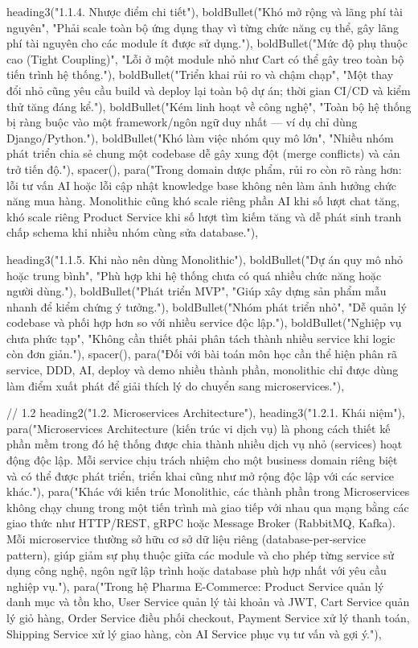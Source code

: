   heading3("1.1.4. Nhược điểm chi tiết"),
  boldBullet("Khó mở rộng và lãng phí tài nguyên", "Phải scale toàn bộ ứng dụng thay vì từng chức năng cụ thể, gây lãng phí tài nguyên cho các module ít được sử dụng."),
  boldBullet("Mức độ phụ thuộc cao (Tight Coupling)", "Lỗi ở một module nhỏ như Cart có thể gây treo toàn bộ tiến trình hệ thống."),
  boldBullet("Triển khai rủi ro và chậm chạp", "Một thay đổi nhỏ cũng yêu cầu build và deploy lại toàn bộ dự án; thời gian CI/CD và kiểm thử tăng đáng kể."),
  boldBullet("Kém linh hoạt về công nghệ", "Toàn bộ hệ thống bị ràng buộc vào một framework/ngôn ngữ duy nhất — ví dụ chỉ dùng Django/Python."),
  boldBullet("Khó làm việc nhóm quy mô lớn", "Nhiều nhóm phát triển chia sẻ chung một codebase dễ gây xung đột (merge conflicts) và cản trở tiến độ."),
  spacer(),
  para("Trong domain dược phẩm, rủi ro còn rõ ràng hơn: lỗi tư vấn AI hoặc lỗi cập nhật knowledge base không nên làm ảnh hưởng chức năng mua hàng. Monolithic cũng khó scale riêng phần AI khi số lượt chat tăng, khó scale riêng Product Service khi số lượt tìm kiếm tăng và dễ phát sinh tranh chấp schema khi nhiều nhóm cùng sửa database."),

  heading3("1.1.5. Khi nào nên dùng Monolithic"),
  boldBullet("Dự án quy mô nhỏ hoặc trung bình", "Phù hợp khi hệ thống chưa có quá nhiều chức năng hoặc người dùng."),
  boldBullet("Phát triển MVP", "Giúp xây dựng sản phẩm mẫu nhanh để kiểm chứng ý tưởng."),
  boldBullet("Nhóm phát triển nhỏ", "Dễ quản lý codebase và phối hợp hơn so với nhiều service độc lập."),
  boldBullet("Nghiệp vụ chưa phức tạp", "Không cần thiết phải phân tách thành nhiều service khi logic còn đơn giản."),
  spacer(),
  para("Đối với bài toán môn học cần thể hiện phân rã service, DDD, AI, deploy và demo nhiều thành phần, monolithic chỉ được dùng làm điểm xuất phát để giải thích lý do chuyển sang microservices."),

  // 1.2
  heading2("1.2. Microservices Architecture"),
  heading3("1.2.1. Khái niệm"),
  para("Microservices Architecture (kiến trúc vi dịch vụ) là phong cách thiết kế phần mềm trong đó hệ thống được chia thành nhiều dịch vụ nhỏ (services) hoạt động độc lập. Mỗi service chịu trách nhiệm cho một business domain riêng biệt và có thể được phát triển, triển khai cũng như mở rộng độc lập với các service khác."),
  para("Khác với kiến trúc Monolithic, các thành phần trong Microservices không chạy chung trong một tiến trình mà giao tiếp với nhau qua mạng bằng các giao thức như HTTP/REST, gRPC hoặc Message Broker (RabbitMQ, Kafka). Mỗi microservice thường sở hữu cơ sở dữ liệu riêng (database-per-service pattern), giúp giảm sự phụ thuộc giữa các module và cho phép từng service sử dụng công nghệ, ngôn ngữ lập trình hoặc database phù hợp nhất với yêu cầu nghiệp vụ."),
  para("Trong hệ Pharma E-Commerce: Product Service quản lý danh mục và tồn kho, User Service quản lý tài khoản và JWT, Cart Service quản lý giỏ hàng, Order Service điều phối checkout, Payment Service xử lý thanh toán, Shipping Service xử lý giao hàng, còn AI Service phục vụ tư vấn và gợi ý."),

